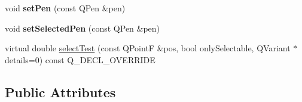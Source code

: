 \begin{DoxyCompactItemize}
\item 
\mbox{\label{class_q_c_p_item_pixmap_acdade1305edb4b5cae14f97fd132065f}} 
void {\bfseries set\+Pen} (const Q\+Pen \&pen)
\item 
\mbox{\label{class_q_c_p_item_pixmap_afc5e479e88e53740176ce77cb70dd67a}} 
void {\bfseries set\+Selected\+Pen} (const Q\+Pen \&pen)
\item 
virtual double \hyperlink{class_q_c_p_item_pixmap_aa2919a96737ed02f643fe138fb830712}{select\+Test} (const Q\+PointF \&pos, bool only\+Selectable, Q\+Variant $\ast$details=0) const Q\+\_\+\+D\+E\+C\+L\+\_\+\+O\+V\+E\+R\+R\+I\+DE
\end{DoxyCompactItemize}
\subsection*{Public Attributes}
